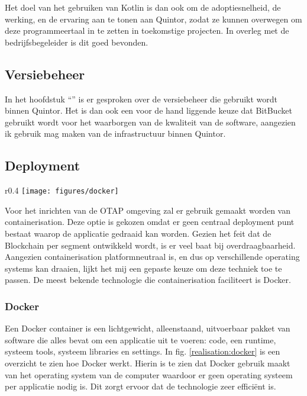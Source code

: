 Het doel van het gebruiken van Kotlin is dan ook om de adoptiesnelheid, de werking, en de ervaring aan te tonen aan Quintor, zodat ze kunnen overwegen om deze programmeertaal in te zetten in toekomstige projecten. In overleg met de bedrijfsbegeleider is dit goed bevonden.

\subsection{Versiebeheer}

In het hoofdstuk ``'' is er gesproken over de versiebeheer die gebruikt wordt binnen Quintor. Het is dan ook een voor de hand liggende keuze dat BitBucket gebruikt wordt voor het waarborgen van de kwaliteit van de software, aangezien ik gebruik mag maken van de infrastructuur binnen Quintor. 

\subsection{Deployment}

\begin{wrapfigure}[11]{r}{0.4\textwidth}
    \texttt{[image: figures/docker]}
    \caption[Werking Docker]{Overzicht van de werking van Docker.}
    \label{realisation:docker}
\end{wrapfigure} 

Voor het inrichten van de \gls{OTAP} omgeving zal er gebruik gemaakt worden van containerisation. Deze optie is gekozen omdat er geen centraal deployment punt bestaat waarop de applicatie gedraaid kan worden. Gezien het feit dat de Blockchain per segment ontwikkeld wordt, is er veel baat bij overdraagbaarheid. Aangezien containerisation platformneutraal is, en dus op verschillende operating systems kan draaien, lijkt het mij een gepaste keuze om deze techniek toe te passen. De meest bekende technologie die containerisation faciliteert is Docker.

\subsubsection{Docker}

Een Docker container is een lichtgewicht, alleenstaand, uitvoerbaar pakket van software die alles bevat om een applicatie uit te voeren: code, een runtime, systeem tools, systeem libraries en settings. In fig. \ref{realisation:docker} is een overzicht te zien hoe Docker werkt. Hierin is te zien dat Docker gebruik maakt van het operating system van de computer waardoor er geen operating systeem per applicatie nodig is. Dit zorgt ervoor dat de technologie zeer efficiënt is.
